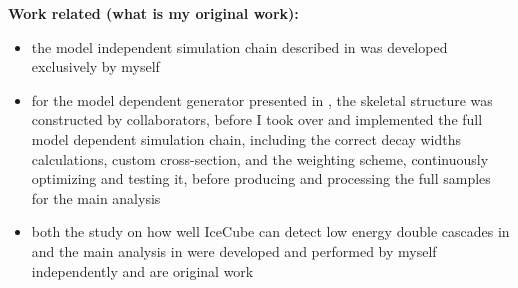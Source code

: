 \textbf{Work related (what is my original work):}
\begin{itemize}
    \item the model independent simulation chain described in  was developed exclusively by myself
    \item for the model dependent generator presented in , the skeletal structure was constructed by collaborators, before I took over and implemented the full model dependent simulation chain, including the correct decay widths calculations, custom cross-section, and the weighting scheme, continuously optimizing and testing it, before producing and processing the full samples for the main analysis
    \item both the study on how well IceCube can detect low energy double cascades in  and the main analysis in  were developed and performed by myself independently and are original work
\end{itemize}


